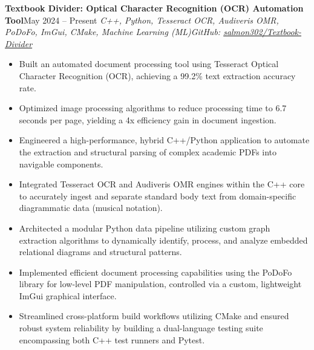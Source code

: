 \documentclass[letterpaper,11pt]{article}
\newcommand{\resumeEntry}[4]{
    \vspace{2pt}
    \noindent\textbf{#1}\hfill{#2}
    \newline
    \noindent\textit{#3}\hfill\textit{#4}
    \vspace{-3pt}
}
\newcommand{\resumeItemListStart}{\begin{itemize}[label=$\bullet$, leftmargin=1.1em, itemsep=0pt, parsep=0pt, topsep=2pt]}
\newcommand{\resumeItemListEnd}{\end{itemize}}
\begin{document}
    \resumeEntry
        {Textbook Divider: Optical Character Recognition (OCR) Automation Tool}
        {May 2024 – Present}
        {C++, Python, Tesseract OCR, Audiveris OMR, PoDoFo, ImGui, CMake, Machine Learning (ML)}
        {GitHub: \href{https://github.com/salmon302/Textbook-Divider}{salmon302/Textbook-Divider}}
    \resumeItemListStart
        \item Built an automated document processing tool using Tesseract Optical Character Recognition (OCR), achieving a 99.2\% text extraction accuracy rate.
        \item Optimized image processing algorithms to reduce processing time to 6.7 seconds per page, yielding a 4x efficiency gain in document ingestion.
        \item Engineered a high-performance, hybrid C++/Python application to automate the extraction and structural parsing of complex academic PDFs into navigable components.
        \item Integrated Tesseract OCR and Audiveris OMR engines within the C++ core to accurately ingest and separate standard body text from domain-specific diagrammatic data (musical notation).
        \item Architected a modular Python data pipeline utilizing custom graph extraction algorithms to dynamically identify, process, and analyze embedded relational diagrams and structural patterns.
        \item Implemented efficient document processing capabilities using the PoDoFo library for low-level PDF manipulation, controlled via a custom, lightweight ImGui graphical interface.
        \item Streamlined cross-platform build workflows utilizing CMake and ensured robust system reliability by building a dual-language testing suite encompassing both C++ test runners and Pytest.
    \resumeItemListEnd
\end{document}
